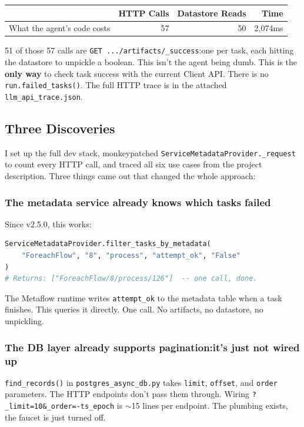 \documentclass[11pt,a4paper]{article}
\begin{document}
\begin{center}
\begin{tabular}{lrrr}
\toprule
& \textbf{HTTP Calls} & \textbf{Datastore Reads} & \textbf{Time} \\
\midrule
What the agent's code costs & 57 & 50 & 2,074ms \\
\bottomrule
\end{tabular}
\end{center}

51 of those 57 calls are \texttt{GET .../artifacts/\_success}:one per task, each hitting the datastore to unpickle a boolean. This isn't the agent being dumb. This is the \textbf{only way} to check task success with the current Client API. There is no \texttt{run.failed\_tasks()}. The full HTTP trace is in the attached \texttt{llm\_api\_trace.json}.

\subsection{Three Discoveries}

I set up the full dev stack, monkeypatched \texttt{ServiceMetadataProvider.\_request} to count every HTTP call, and traced all six use cases from the project description. Three things came out that changed the whole approach:

\subsubsection{The metadata service already knows which tasks failed}

Since v2.5.0, this works:

\begin{lstlisting}[language=Python]
ServiceMetadataProvider.filter_tasks_by_metadata(
    "ForeachFlow", "8", "process", "attempt_ok", "False"
)
# Returns: ["ForeachFlow/8/process/126"]  -- one call, done.
\end{lstlisting}

The Metaflow runtime writes \texttt{attempt\_ok} to the metadata table when a task finishes. This queries it directly. One call. No artifacts, no datastore, no unpickling.

\subsubsection{The DB layer already supports pagination:it's just not wired up}

\texttt{find\_records()} in \texttt{postgres\_async\_db.py} takes \texttt{limit}, \texttt{offset}, and \texttt{order} parameters. The HTTP endpoints don't pass them through. Wiring \texttt{?\_limit=10\&\_order=-ts\_epoch} is $\sim$15 lines per endpoint. The plumbing exists, the faucet is just turned off.
\end{document}
